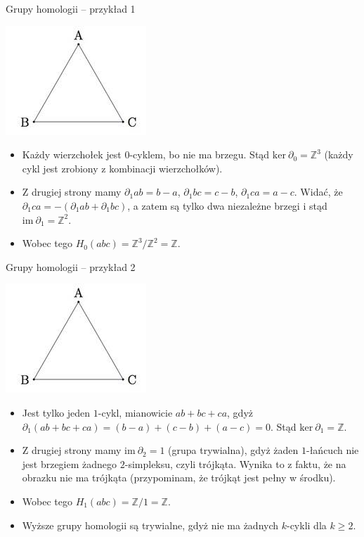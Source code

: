 \documentclass{beamer}
\begin{document}
\begin{frame}{Grupy homologii -- przykład 1}

\begin{center}
\includegraphics[scale = 0.7]{Triangle.jpeg}
\end{center}

\begin{itemize}
	\item Każdy wierzchołek jest $0$-cyklem, bo nie ma brzegu. Stąd $\text{ker}\ \partial_0 = \mathbb{Z}^3$ (każdy cykl jest zrobiony z kombinacji wierzchołków).
	\item Z drugiej strony mamy $\partial_1 ab = b - a$, $\partial_1 bc = c - b$, $\partial_1 ca = a - c$. Widać, że $\partial_1 ca = -(\partial_1 ab + \partial_1 bc)$, a zatem są tylko dwa niezależne brzegi i stąd $\text{im}\ \partial_1 = \mathbb{Z}^2$.
	\item Wobec tego $H_0(abc) = \mathbb{Z}^3 / \mathbb{Z}^2 = \mathbb{Z}$.
\end{itemize}

\end{frame}

\begin{frame}{Grupy homologii -- przykład 2}

\begin{center}
\includegraphics[scale = 0.7]{Triangle.jpeg}
\end{center}

\begin{itemize}
	\item Jest tylko jeden $1$-cykl, mianowicie $ab + bc + ca$, gdyż $\partial_1 (ab + bc + ca) = (b - a) + (c - b) + (a - c) = 0$. Stąd $\text{ker}\ \partial_1 = \mathbb{Z}$.
	\item Z drugiej strony mamy $\text{im}\ \partial_2 = 1$ (grupa trywialna), gdyż żaden $1$-łańcuch nie jest brzegiem żadnego $2$-simpleksu, czyli trójkąta. Wynika to z faktu, że na obrazku nie ma trójkąta (przypominam, że trójkąt jest pełny w środku).
	\item Wobec tego $H_1(abc) = \mathbb{Z} / 1 = \mathbb{Z}$.
	\item Wyższe grupy homologii są trywialne, gdyż nie ma żadnych $k$-cykli dla $k \geq 2$.
\end{itemize}

\end{frame}
\end{document}
